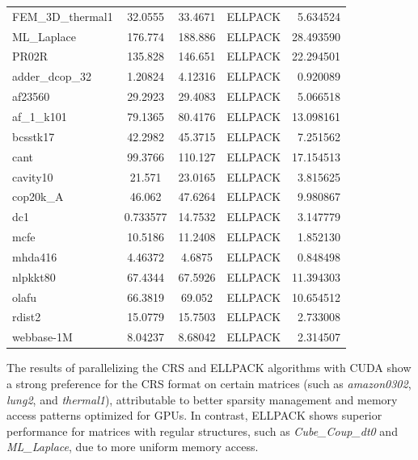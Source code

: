 \documentclass[12pt,oneside]{book} %
\begin{document}
\begin{longtable}{lcccr}
    FEM\_3D\_thermal1 & 32.0555      & 33.4671          & ELLPACK                 & 5.634524         \\
    ML\_Laplace       & 176.774      & 188.886          & ELLPACK                 & 28.493590        \\
    PR02R             & 135.828      & 146.651          & ELLPACK                 & 22.294501        \\
    adder\_dcop\_32   & 1.20824      & 4.12316          & ELLPACK                 & 0.920089         \\
    af23560           & 29.2923      & 29.4083          & ELLPACK                 & 5.066518         \\
    af\_1\_k101       & 79.1365      & 80.4176          & ELLPACK                 & 13.098161        \\
    bcsstk17          & 42.2982      & 45.3715          & ELLPACK                 & 7.251562         \\
    cant              & 99.3766      & 110.127          & ELLPACK                 & 17.154513        \\
    cavity10          & 21.571       & 23.0165          & ELLPACK                 & 3.815625         \\
    cop20k\_A         & 46.062       & 47.6264          & ELLPACK                 & 9.980867         \\
    dc1               & 0.733577     & 14.7532          & ELLPACK                 & 3.147779         \\
    mcfe              & 10.5186      & 11.2408          & ELLPACK                 & 1.852130         \\
    mhda416           & 4.46372      & 4.6875           & ELLPACK                 & 0.848498         \\
    nlpkkt80          & 67.4344      & 67.5926          & ELLPACK                 & 11.394303        \\
    olafu             & 66.3819      & 69.052           & ELLPACK                 & 10.654512        \\
    rdist2            & 15.0779      & 15.7503          & ELLPACK                 & 2.733008         \\
    webbase-1M        & 8.04237      & 8.68042          & ELLPACK                 & 2.314507         \\
\end{longtable}

The results of parallelizing the CRS and ELLPACK algorithms with CUDA show a
strong preference for the CRS format on certain matrices (such as
\textit{amazon0302}, \textit{lung2}, and \textit{thermal1}), attributable to
better sparsity management and memory access patterns optimized for GPUs. In
contrast, ELLPACK shows superior performance for matrices with regular
structures, such as \textit{Cube\_Coup\_dt0} and \textit{ML\_Laplace}, due to
more uniform memory access.
\end{document}
